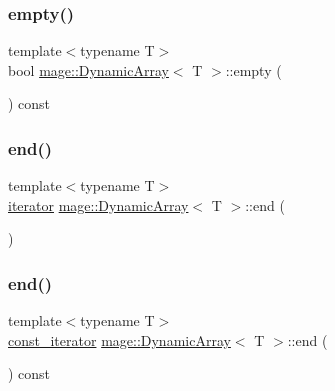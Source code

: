 \mbox{\label{classmage_1_1_dynamic_array_ac8a35d1a6efc06808920af92317ee56e}} 
\subsubsection{\texorpdfstring{empty()}{empty()}}
{\footnotesize\ttfamily template$<$typename T$>$ \\
bool \mbox{\hyperlink{classmage_1_1_dynamic_array}{mage\+::\+Dynamic\+Array}}$<$ T $>$\+::empty (\begin{DoxyParamCaption}{ }\end{DoxyParamCaption}) const\hspace{0.3cm}{\ttfamily [noexcept]}}

\mbox{\label{classmage_1_1_dynamic_array_a0af633c402b6710678a6d114233d90d3}} 
\subsubsection{\texorpdfstring{end()}{end()}\hspace{0.1cm}{\footnotesize\ttfamily [1/2]}}
{\footnotesize\ttfamily template$<$typename T$>$ \\
\mbox{\hyperlink{classmage_1_1_dynamic_array_af49b03e8ab90f3f38f6fc735cef81baf}{iterator}} \mbox{\hyperlink{classmage_1_1_dynamic_array}{mage\+::\+Dynamic\+Array}}$<$ T $>$\+::end (\begin{DoxyParamCaption}{ }\end{DoxyParamCaption})\hspace{0.3cm}{\ttfamily [noexcept]}}

\mbox{\label{classmage_1_1_dynamic_array_ae179b8d9d6c5862c7857850202835d37}} 
\subsubsection{\texorpdfstring{end()}{end()}\hspace{0.1cm}{\footnotesize\ttfamily [2/2]}}
{\footnotesize\ttfamily template$<$typename T$>$ \\
\mbox{\hyperlink{classmage_1_1_dynamic_array_ad27aa1273eb102bbd596a13a00159001}{const\+\_\+iterator}} \mbox{\hyperlink{classmage_1_1_dynamic_array}{mage\+::\+Dynamic\+Array}}$<$ T $>$\+::end (\begin{DoxyParamCaption}{ }\end{DoxyParamCaption}) const\hspace{0.3cm}{\ttfamily [noexcept]}}

